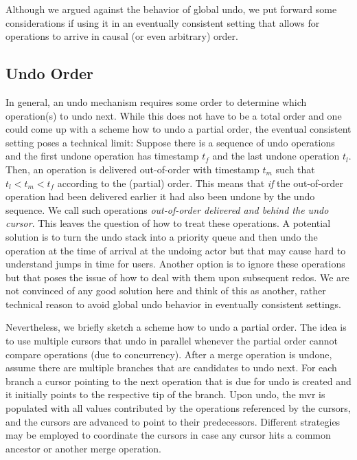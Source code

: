 \documentclass[sigplan,natbib=false,review]{acmart}
\begin{document}
Although we argued against the behavior of global undo, we put forward
some considerations if using it in an eventually consistent setting that
allows for operations to arrive in causal (or even arbitrary) order.

\subsection{Undo Order}

In general, an undo mechanism requires some order to determine which
operation(s) to undo next. 
While this does not have to be a total order and
one could come up with a scheme how to undo a partial order,
the eventual consistent setting poses a technical limit:
Suppose there is a sequence of undo operations and the first undone operation
has timestamp $t_f$ and the last undone operation $t_l$.
Then, an operation is delivered out-of-order with
timestamp $t_m$ such that $t_l < t_m < t_f$ according to the (partial) order.
This means that \emph{if} the out-of-order operation had been delivered earlier it
had also been undone by the undo sequence.
We call such operations \emph{out-of-order delivered and behind the undo cursor}.
This leaves the question of how to treat these operations.
A potential solution is to turn the undo stack into a priority queue and
then undo the operation at the time of arrival at the undoing actor but
that may cause hard to understand jumps in time for users.
Another option is to ignore these operations but that poses the issue of
how to deal with them upon subsequent redos.
We are not convinced of any good solution here and think of this as another,
rather technical reason to avoid global undo behavior in eventually consistent
settings.

Nevertheless, we briefly sketch a scheme how to undo a partial order.
The idea is to use multiple cursors that undo in parallel whenever the
partial order cannot compare operations (due to concurrency).
After a merge operation is undone, assume there are multiple branches
that are candidates to undo next.
For each branch a cursor pointing to the next operation that is due for undo
is created and it initially points to the respective tip of the branch.
Upon undo, the \gls{mvr} is populated with all values contributed by the
operations referenced by the cursors, and the cursors are advanced
to point to their predecessors.
Different strategies may be employed to coordinate the cursors in case
any cursor hits a common ancestor or another merge operation.
\end{document}
